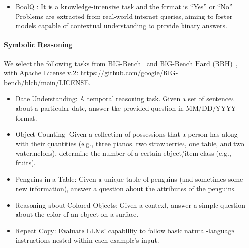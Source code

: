 \begin{itemize}
    
    \item BoolQ
    \citep{clark2019boolq}: It is a knowledge-intensive task and the format is ``Yes'' or ``No''.
    Problems are extracted from real-world internet queries,
    aiming to foster models capable of contextual understanding to provide binary answers.

\end{itemize}



\paragraph{Symbolic Reasoning}

We select the following tasks from BIG-Bench~\citep{srivastava2023bb} and BIG-Bench Hard (BBH)~\citep{suzgun2023bbh}, with Apache License v.2: \url{https://github.com/google/BIG-bench/blob/main/LICENSE}.

\begin{itemize}
    \item Date Understanding: A temporal reasoning task. Given a set of sentences about a particular date,
    answer the provided question in MM/DD/YYYY format.
    \item Object Counting: Given a collection of possessions that a person has along with their quantities (e.g., three pianos, two strawberries, one table, and two watermelons), determine the number of a certain object/item class (e.g., fruits).
    \item Penguins in a Table: Given a unique table of penguins (and sometimes some new information), 
    answer a question about the attributes of the penguins.
    \item Reasoning about Colored Objects: Given a context, 
    answer a simple question about the color of an object on a surface.
    \item Repeat Copy: Evaluate LLMs' capability to follow basic natural-language instructions nested within each example's input.

\end{itemize}

